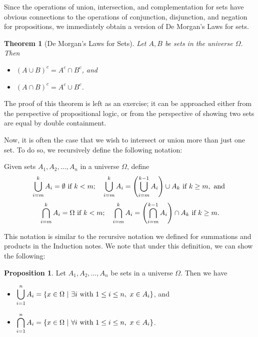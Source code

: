 \documentclass{article}
\newtheorem{theorem}{Theorem}
\theoremstyle{definition}
\newtheorem{prop}{Proposition}
\begin{document}
Since the operations of union, intersection, and complementation for sets have obvious connections to the operations of conjunction, disjunction, and negation for propositions, we immediately obtain a version of De Morgan's Laws for sets.

\begin{theorem}[De Morgan's Laws for Sets]
Let $A, B$ be sets in the universe $\Omega$. Then
\begin{itemize}
\item $(A\cup B)^c = A^c\cap B^c$, and
\item $(A\cap B)^c = A^c\cup B^c$.
\end{itemize}
\end{theorem}

The proof of this theorem is left as an exercise; it can be approached either from the perspective of propositional logic, or from the perspective of showing two sets are equal by double containment.

Now, it is often the case that we wish to intersect or union more than just one set. To do so, we recursively define the following notation:

Given sets $A_1, A_2, \dots, A_n$ in a universe $\Omega$, define
\[\displaystyle\bigcup_{i=m}^k A_i = \emptyset \hbox{ if }k<m; \quad \displaystyle\bigcup_{i=m}^k A_i = \left(\displaystyle\bigcup_{i=m}^{k-1} A_i \right)\cup A_k \hbox{ if }k\geq m,\hbox{ and }\]
\[\displaystyle\bigcap_{i=m}^k A_i = \Omega \hbox{ if }k<m; \quad \displaystyle\bigcap_{i=m}^k A_i = \left(\displaystyle\bigcap_{i=m}^{k-1} A_i \right)\cap A_k \hbox{ if }k\geq m.\]

This notation is similar to the recursive notation we defined for summations and products in the Induction notes. We note that under this definition, we can show the following:

\begin{prop}\label{unionint}
Let $A_1, A_2, \dots, A_n$ be sets in a universe $\Omega$. Then we have
\begin{itemize}
\item $\displaystyle\bigcup_{i=1}^n A_i = \{x\in\Omega\ |\ \exists i\hbox{ with $1\leq i\leq n$}, \ x\in A_i\}$, and 
\item $\displaystyle\bigcap_{i=1}^n A_i = \{x\in\Omega\ |\ \forall i\hbox{ with $1\leq i\leq n$}, \ x\in A_i\}$.
\end{itemize}
\end{prop}
\end{document}
